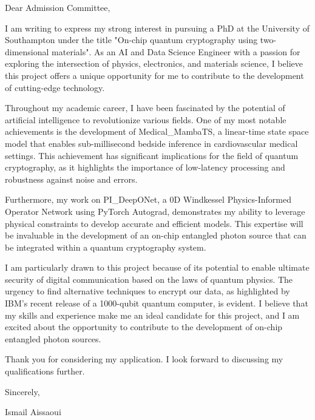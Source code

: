 \documentclass[11pt]{letter}
\begin{document}
\opening{Dear Admission Committee,}

I am writing to express my strong interest in pursuing a PhD at the University of Southampton under the title "On-chip quantum cryptography using two-dimensional materials". As an AI and Data Science Engineer with a passion for exploring the intersection of physics, electronics, and materials science, I believe this project offers a unique opportunity for me to contribute to the development of cutting-edge technology.

Throughout my academic career, I have been fascinated by the potential of artificial intelligence to revolutionize various fields. One of my most notable achievements is the development of Medical_MambaTS, a linear-time state space model that enables sub-millisecond bedside inference in cardiovascular medical settings. This achievement has significant implications for the field of quantum cryptography, as it highlights the importance of low-latency processing and robustness against noise and errors.

Furthermore, my work on PI_DeepONet, a 0D Windkessel Physics-Informed Operator Network using PyTorch Autograd, demonstrates my ability to leverage physical constraints to develop accurate and efficient models. This expertise will be invaluable in the development of an on-chip entangled photon source that can be integrated within a quantum cryptography system.

I am particularly drawn to this project because of its potential to enable ultimate security of digital communication based on the laws of quantum physics. The urgency to find alternative techniques to encrypt our data, as highlighted by IBM's recent release of a 1000-qubit quantum computer, is evident. I believe that my skills and experience make me an ideal candidate for this project, and I am excited about the opportunity to contribute to the development of on-chip entangled photon sources.

Thank you for considering my application. I look forward to discussing my qualifications further.

Sincerely,

Ismail Aissaoui

\closing{}
\end{document}

